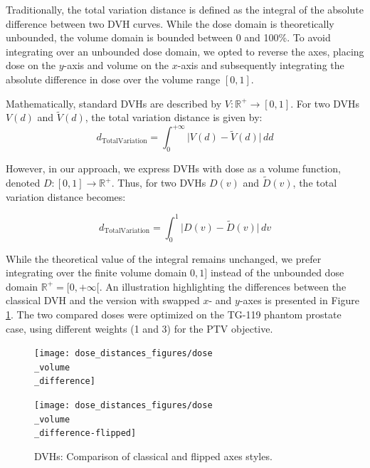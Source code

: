 Traditionally, the total variation distance is defined as the integral of the absolute difference between two DVH curves.
While the dose domain is theoretically unbounded, the volume domain is bounded between 0 and 100\%.
To avoid integrating over an unbounded dose domain, we opted to reverse the axes, placing dose on the $y$-axis and volume on the $x$-axis and subsequently integrating the absolute difference in dose over the volume range $[0,1]$.

Mathematically, standard DVHs are described by $V: \mathbb{R}^+ \to [0,1]$.
For two DVHs $V(d)$ and $\tilde{V}(d)$, the total variation distance is given by:
$$
d_{\text{TotalVariation}} = \int_{0}^{+\infty} \lvert V(d) - \tilde{V}(d) \rvert \, dd
$$

However, in our approach, we express DVHs with dose as a volume function, denoted $D: [0,1] \to \mathbb{R}^+$.
Thus, for two DVHs $D(v)$ and $\tilde{D}(v)$, the total variation distance becomes:

$$
d_{\text{TotalVariation}} = \int_{0}^{1} \lvert D(v) - \tilde{D}(v) \rvert \, dv
$$

While the theoretical value of the integral remains unchanged, we prefer integrating over the finite volume domain $0,1]$ instead of the unbounded dose domain $\mathbb{R}^+ = [0,+\infty[$.
An illustration highlighting the differences between the classical DVH and the version with swapped $x$- and $y$-axes is presented in Figure \ref{fig:dose_volume_difference}.
The two compared doses were optimized on the TG-119 phantom prostate case, using different weights (1 and 3) for the PTV objective.

\begin{figure}
	\centering
	\texttt{[image: dose\_distances\_figures/dose\\\_volume\\\_difference]}
	
	\centering
	\texttt{[image: dose\_distances\_figures/dose\\\_volume\\\_difference-flipped]}
	
	\caption{DVHs: Comparison of classical and flipped axes styles.}
	\label{fig:dose_volume_difference}
\end{figure}

